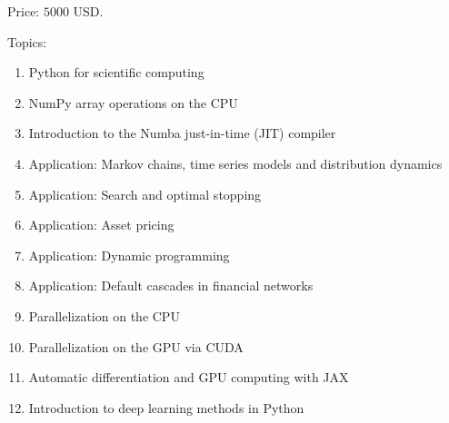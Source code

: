 \documentclass[12pt]{article}
\begin{document}
Price: $5000$ USD.

Topics:
%
\begin{enumerate}
    \item Python for scientific computing
    \item NumPy array operations on the CPU
    \item Introduction to the Numba just-in-time (JIT) compiler
    \item Application: Markov chains, time series models and distribution dynamics
    \item Application: Search and optimal stopping
    \item Application: Asset pricing
    \item Application: Dynamic programming
    \item Application: Default cascades in financial networks
    \item Parallelization on the CPU
    \item Parallelization on the GPU via CUDA
    \item Automatic differentiation and GPU computing with JAX
    \item Introduction to deep learning methods in Python
\end{enumerate}
\end{document}
